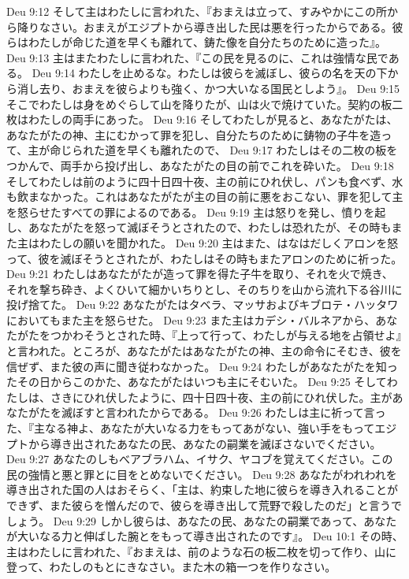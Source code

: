 Deu 9:12  そして主はわたしに言われた、『おまえは立って、すみやかにこの所から降りなさい。おまえがエジプトから導き出した民は悪を行ったからである。彼らはわたしが命じた道を早くも離れて、鋳た像を自分たちのために造った』。
Deu 9:13  主はまたわたしに言われた、『この民を見るのに、これは強情な民である。
Deu 9:14  わたしを止めるな。わたしは彼らを滅ぼし、彼らの名を天の下から消し去り、おまえを彼らよりも強く、かつ大いなる国民としよう』。
Deu 9:15  そこでわたしは身をめぐらして山を降りたが、山は火で焼けていた。契約の板二枚はわたしの両手にあった。
Deu 9:16  そしてわたしが見ると、あなたがたは、あなたがたの神、主にむかって罪を犯し、自分たちのために鋳物の子牛を造って、主が命じられた道を早くも離れたので、
Deu 9:17  わたしはその二枚の板をつかんで、両手から投げ出し、あなたがたの目の前でこれを砕いた。
Deu 9:18  そしてわたしは前のように四十日四十夜、主の前にひれ伏し、パンも食べず、水も飲まなかった。これはあなたがたが主の目の前に悪をおこない、罪を犯して主を怒らせたすべての罪によるのである。
Deu 9:19  主は怒りを発し、憤りを起し、あなたがたを怒って滅ぼそうとされたので、わたしは恐れたが、その時もまた主はわたしの願いを聞かれた。
Deu 9:20  主はまた、はなはだしくアロンを怒って、彼を滅ぼそうとされたが、わたしはその時もまたアロンのために祈った。
Deu 9:21  わたしはあなたがたが造って罪を得た子牛を取り、それを火で焼き、それを撃ち砕き、よくひいて細かいちりとし、そのちりを山から流れ下る谷川に投げ捨てた。
Deu 9:22  あなたがたはタベラ、マッサおよびキブロテ・ハッタワにおいてもまた主を怒らせた。
Deu 9:23  また主はカデシ・バルネアから、あなたがたをつかわそうとされた時、『上って行って、わたしが与える地を占領せよ』と言われた。ところが、あなたがたはあなたがたの神、主の命令にそむき、彼を信ぜず、また彼の声に聞き従わなかった。
Deu 9:24  わたしがあなたがたを知ったその日からこのかた、あなたがたはいつも主にそむいた。
Deu 9:25  そしてわたしは、さきにひれ伏したように、四十日四十夜、主の前にひれ伏した。主があなたがたを滅ぼすと言われたからである。
Deu 9:26  わたしは主に祈って言った、『主なる神よ、あなたが大いなる力をもってあがない、強い手をもってエジプトから導き出されたあなたの民、あなたの嗣業を滅ぼさないでください。
Deu 9:27  あなたのしもべアブラハム、イサク、ヤコブを覚えてください。この民の強情と悪と罪とに目をとめないでください。
Deu 9:28  あなたがわれわれを導き出された国の人はおそらく、「主は、約束した地に彼らを導き入れることができず、また彼らを憎んだので、彼らを導き出して荒野で殺したのだ」と言うでしょう。
Deu 9:29  しかし彼らは、あなたの民、あなたの嗣業であって、あなたが大いなる力と伸ばした腕とをもって導き出されたのです』。
Deu 10:1  その時、主はわたしに言われた、『おまえは、前のような石の板二枚を切って作り、山に登って、わたしのもとにきなさい。また木の箱一つを作りなさい。
